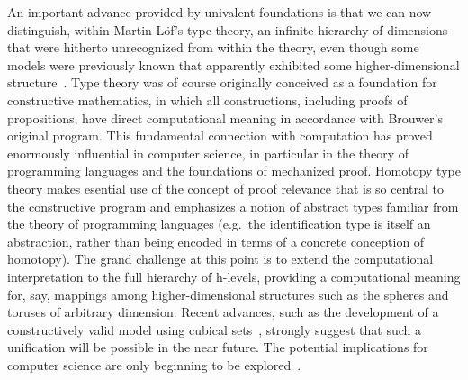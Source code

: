 \documentclass[11pt]{article}
\theoremstyle{remark}
\theoremstyle{definition}
\begin{document}
An important advance provided by univalent foundations is that we can now distinguish, within Martin-L\"{o}f's type theory, an infinite hierarchy of dimensions that were hitherto unrecognized from within the theory, even though some models were previously known that apparently exhibited some higher-dimensional structure~\cite{hofmann-streicher}.  Type theory was of course originally conceived as a foundation for
constructive mathematics, in which all constructions, including proofs of propositions, have direct computational
meaning in accordance with Brouwer's original program.  This fundamental connection with computation has proved enormously
influential in computer science, in particular in the theory of programming languages and the foundations of mechanized
proof.  Homotopy type theory makes esential use of the concept of proof relevance that is so central to the constructive
program %
and emphasizes a notion of abstract types familiar from the theory of programming languages (e.g.\ the identification type is itself an abstraction, rather than being encoded in terms of a concrete conception of homotopy).  The grand challenge at this point is to extend the
computational interpretation to the full hierarchy of h-levels, providing a computational meaning for, say, mappings
among higher-dimensional structures such as the spheres and toruses of arbitrary dimension.  Recent advances, such as
the development of a constructively valid model using cubical sets~\cite{bch}, strongly suggest that such a unification
will be possible in the near future.  The potential implications for computer science are only beginning to be explored~\cite{patch-theory}.

\end{document}
